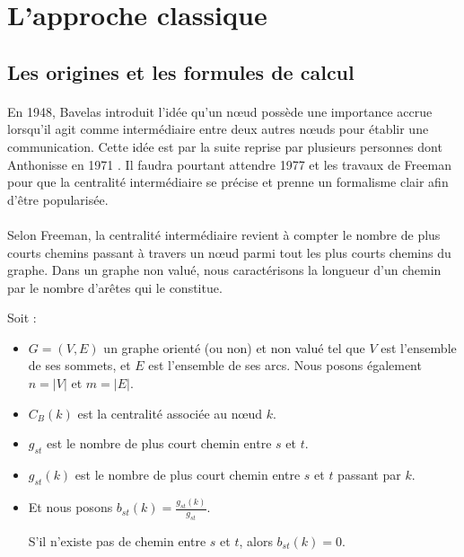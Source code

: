 \documentclass[a4paper, 10pt]{report}
\begin{document}
     \section{L'approche classique}

		\subsection{Les origines et les formules de calcul}
		
% 
% 

\paragraph{}En 1948, Bavelas \cite{Bavelas1948Mathematical} introduit l'idée qu'un n\oe ud possède une importance accrue lorsqu'il agit comme intermédiaire entre deux autres n\oe uds pour établir une communication. Cette idée est par la suite reprise par plusieurs personnes dont Anthonisse en 1971 \cite{Anthonisse1971Rush}. Il faudra pourtant attendre 1977 et les travaux de Freeman \cite{Freeman1977SetMeasure, Freeman1979Centrality} pour que la centralité intermédiaire se précise et prenne un formalisme clair afin d'être popularisée.


% 
% 

\paragraph{}Selon Freeman, la centralité intermédiaire revient à compter le nombre de plus courts chemins passant à travers un n\oe ud parmi tout les plus courts chemins du graphe. Dans un graphe non valué, nous caractérisons la longueur d'un chemin par le nombre d'arêtes qui le constitue.

Soit :

\begin{itemize}
	\item $G=(V, E)$ un graphe orienté (ou non) et non valué tel que $V$ est l'ensemble de ses sommets, et $E$ est l'ensemble de ses arcs. Nous posons également $n=|V|$ et $m=|E|$. 
	\item $C_{B}(k)$ est la centralité associée au n\oe ud $k$.
	\item $g_{st}$ est le nombre de plus court chemin entre $s$ et $t$.
	\item $g_{st}(k)$ est le nombre de plus court chemin entre $s$ et $t$ passant par $k$.
	\item Et nous posons $b_{st}(k)=\frac{g_{st}(k)}{g_{st}}$.
	
	S'il n'existe pas de chemin entre $s$ et $t$, alors $b_{st}(k)=0$.
\end{itemize}
\end{document}
